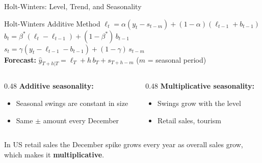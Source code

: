\documentclass[aspectratio=169, 11pt]{beamer}
\begin{document}
\begin{frame}{Holt-Winters: Level, Trend, and Seasonality}
  \begin{definitionbox}{Holt-Winters Additive Method \parencite{Winters1960}}
    {\footnotesize
    $\ell_t = \alpha(y_t - s_{t-m}) + (1-\alpha)(\ell_{t-1}+b_{t-1})$\\[1pt]
    $b_t = \beta^*(\ell_t - \ell_{t-1}) + (1-\beta^*)\,b_{t-1}$\\[1pt]
    $s_t = \gamma(y_t - \ell_{t-1} - b_{t-1}) + (1-\gamma)\,s_{t-m}$\\[1pt]
    \textbf{Forecast:} $\hat{y}_{T+h|T} = \ell_T + h\,b_T + s_{T+h-m}$
    \quad ($m$ = seasonal period)
    }
  \end{definitionbox}
  \begin{columns}[T]
    \begin{column}{0.48\textwidth}
      \textbf{Additive seasonality:}
      \begin{itemize}\small\itemsep0pt
        \item Seasonal swings are constant in size
        \item Same $\pm$ amount every December
      \end{itemize}
    \end{column}
    \begin{column}{0.48\textwidth}
      \textbf{Multiplicative seasonality:}
      \begin{itemize}\small\itemsep0pt
        \item Swings grow with the level
        \item Retail sales, tourism
      \end{itemize}
    \end{column}
  \end{columns}
  \vspace{0.2cm}
  In US retail sales the December spike grows every year as overall sales grow,
  which makes it \textbf{multiplicative}.
\end{frame}
\end{document}
